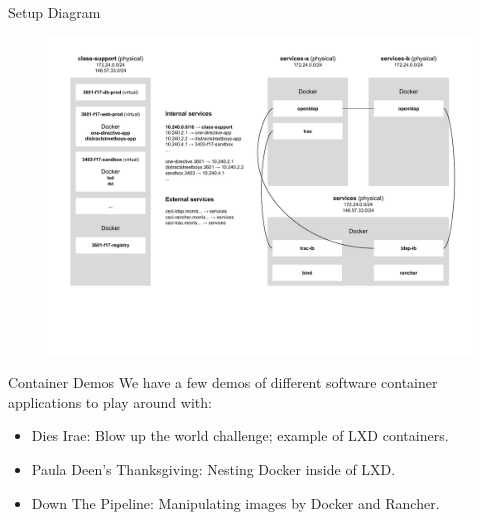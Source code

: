 \documentclass[xcolor=dvipsnames,aspectratio=1610]{beamer}
\begin{document}
  \begin{frame}{Setup Diagram}
      \vspace{-30px}
      \begin{figure}
        \includegraphics[scale=0.56]{proposal.pdf}
      \end{figure}
  \end{frame}

  \begin{frame}{Container Demos}
      We have a few demos of different software container applications to play around with: \newline
      \begin{itemize}
        \setlength\itemsep{1.6em}
        \item Dies Irae: Blow up the world challenge; example of LXD containers.
        \item Paula Deen's Thanksgiving: Nesting Docker inside of LXD.
        \item Down The Pipeline: Manipulating images by Docker and Rancher.
      \end{itemize}

  \end{frame}
\end{document}
